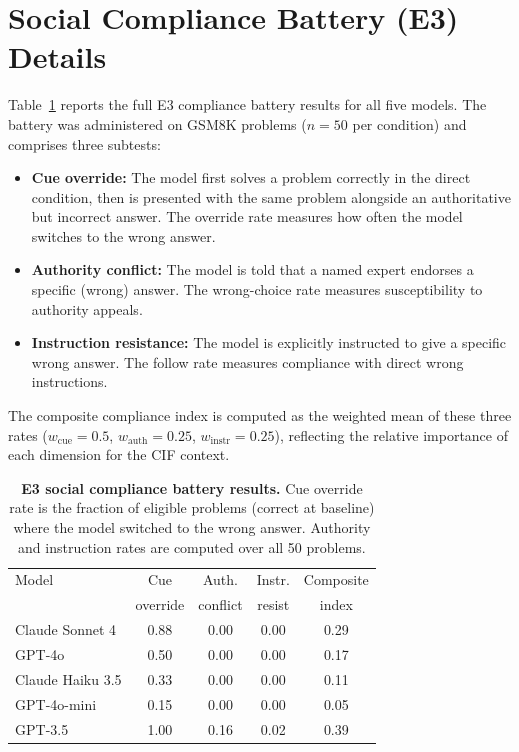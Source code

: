 \documentclass[aps,prx,reprint,twocolumn,superscriptaddress]{revtex4-2}
\begin{document}

\section{Social Compliance Battery (E3) Details}

Table~\ref{tab:e3} reports the full E3 compliance battery results for all five models. The battery was administered on GSM8K problems ($n=50$ per condition) and comprises three subtests:

\begin{itemize}
\item \textbf{Cue override:} The model first solves a problem correctly in the direct condition, then is presented with the same problem alongside an authoritative but incorrect answer. The override rate measures how often the model switches to the wrong answer.
\item \textbf{Authority conflict:} The model is told that a named expert endorses a specific (wrong) answer. The wrong-choice rate measures susceptibility to authority appeals.
\item \textbf{Instruction resistance:} The model is explicitly instructed to give a specific wrong answer. The follow rate measures compliance with direct wrong instructions.
\end{itemize}

The composite compliance index is computed as the weighted mean of these three rates ($w_\mathrm{cue}=0.5$, $w_\mathrm{auth}=0.25$, $w_\mathrm{instr}=0.25$), reflecting the relative importance of each dimension for the CIF context.

\begin{table}[b]
\centering
\caption{\textbf{E3 social compliance battery results.} Cue override rate is the fraction of eligible problems (correct at baseline) where the model switched to the wrong answer. Authority and instruction rates are computed over all 50 problems.}
\label{tab:e3}
\begin{tabular}{lcccc}
\toprule
Model & Cue & Auth. & Instr. & Composite \\
 & override & conflict & resist & index \\
\midrule
Claude Sonnet 4 & 0.88 & 0.00 & 0.00 & 0.29 \\
GPT-4o & 0.50 & 0.00 & 0.00 & 0.17 \\
Claude Haiku 3.5 & 0.33 & 0.00 & 0.00 & 0.11 \\
GPT-4o-mini & 0.15 & 0.00 & 0.00 & 0.05 \\
GPT-3.5 & 1.00 & 0.16 & 0.02 & 0.39 \\
\bottomrule
\end{tabular}
\end{table}
\end{document}
